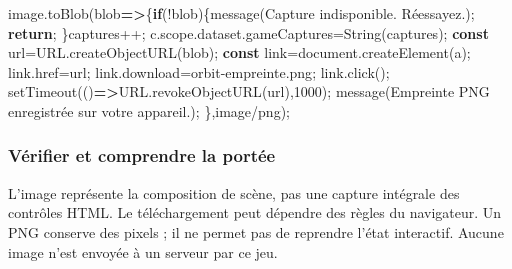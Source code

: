\documentclass[
  canadien,
  11pt,
  letterpaper,
]{article}
\newenvironment{Shaded}{}{}
\newcommand{\AttributeTok}[1]{\textcolor[rgb]{0.49,0.56,0.16}{#1}}
\newcommand{\BuiltInTok}[1]{\textcolor[rgb]{0.00,0.50,0.00}{#1}}
\newcommand{\ControlFlowTok}[1]{\textcolor[rgb]{0.00,0.44,0.13}{\textbf{#1}}}
\newcommand{\DecValTok}[1]{\textcolor[rgb]{0.25,0.63,0.44}{#1}}
\newcommand{\FunctionTok}[1]{\textcolor[rgb]{0.02,0.16,0.49}{#1}}
\newcommand{\KeywordTok}[1]{\textcolor[rgb]{0.00,0.44,0.13}{\textbf{#1}}}
\newcommand{\NormalTok}[1]{#1}
\newcommand{\OperatorTok}[1]{\textcolor[rgb]{0.40,0.40,0.40}{#1}}
\newcommand{\PreprocessorTok}[1]{\textcolor[rgb]{0.74,0.48,0.00}{#1}}
\newcommand{\StringTok}[1]{\textcolor[rgb]{0.25,0.44,0.63}{#1}}
\begin{document}
\begin{Shaded}
\begin{Highlighting}[]
\NormalTok{image}\OperatorTok{.}\FunctionTok{toBlob}\NormalTok{(blob}\KeywordTok{=\textgreater{}}\NormalTok{\{}\ControlFlowTok{if}\NormalTok{(}\OperatorTok{!}\NormalTok{blob)\{}\FunctionTok{message}\NormalTok{(}\StringTok{\textquotesingle{}Capture indisponible. Réessayez.\textquotesingle{}}\NormalTok{)}\OperatorTok{;}
\ControlFlowTok{return}\OperatorTok{;}
\NormalTok{\}captures}\OperatorTok{++;}
\NormalTok{c}\OperatorTok{.}\AttributeTok{scope}\OperatorTok{.}\AttributeTok{dataset}\OperatorTok{.}\AttributeTok{gameCaptures}\OperatorTok{=}\BuiltInTok{String}\NormalTok{(captures)}\OperatorTok{;}
\KeywordTok{const}\NormalTok{ url}\OperatorTok{=}\NormalTok{URL}\OperatorTok{.}\FunctionTok{createObjectURL}\NormalTok{(blob)}\OperatorTok{;}
\KeywordTok{const}\NormalTok{ link}\OperatorTok{=}\BuiltInTok{document}\OperatorTok{.}\FunctionTok{createElement}\NormalTok{(}\StringTok{\textquotesingle{}a\textquotesingle{}}\NormalTok{)}\OperatorTok{;}
\NormalTok{link}\OperatorTok{.}\AttributeTok{href}\OperatorTok{=}\NormalTok{url}\OperatorTok{;}
\NormalTok{link}\OperatorTok{.}\AttributeTok{download}\OperatorTok{=}\StringTok{\textquotesingle{}orbit{-}empreinte.png\textquotesingle{}}\OperatorTok{;}
\NormalTok{link}\OperatorTok{.}\FunctionTok{click}\NormalTok{()}\OperatorTok{;}
\PreprocessorTok{setTimeout}\NormalTok{(()}\KeywordTok{=\textgreater{}}\NormalTok{URL}\OperatorTok{.}\FunctionTok{revokeObjectURL}\NormalTok{(url)}\OperatorTok{,}\DecValTok{1000}\NormalTok{)}\OperatorTok{;}
\FunctionTok{message}\NormalTok{(}\StringTok{\textquotesingle{}Empreinte PNG enregistrée sur votre appareil.\textquotesingle{}}\NormalTok{)}\OperatorTok{;}
\NormalTok{\}}\OperatorTok{,}\StringTok{\textquotesingle{}image/png\textquotesingle{}}\NormalTok{)}\OperatorTok{;}
\end{Highlighting}
\end{Shaded}

\subsubsection{Vérifier et comprendre la
portée}\label{vuxe9rifier-et-comprendre-la-portuxe9e-14}

L'image représente la composition de scène, pas une capture intégrale
des contrôles HTML. Le téléchargement peut dépendre des règles du
navigateur. Un PNG conserve des pixels ; il ne permet pas de reprendre
l'état interactif. Aucune image n'est envoyée à un serveur par ce jeu.
\end{document}
